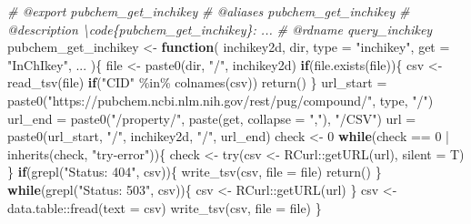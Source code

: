 \documentclass[
]{article}
\newenvironment{Shaded}{\begin{snugshade}}{\end{snugshade}}
\newcommand{\AttributeTok}[1]{\textcolor[rgb]{0.77,0.63,0.00}{#1}}
\newcommand{\CommentTok}[1]{\textcolor[rgb]{0.56,0.35,0.01}{\textit{#1}}}
\newcommand{\ControlFlowTok}[1]{\textcolor[rgb]{0.13,0.29,0.53}{\textbf{#1}}}
\newcommand{\DecValTok}[1]{\textcolor[rgb]{0.00,0.00,0.81}{#1}}
\newcommand{\FunctionTok}[1]{\textcolor[rgb]{0.00,0.00,0.00}{#1}}
\newcommand{\NormalTok}[1]{#1}
\newcommand{\OtherTok}[1]{\textcolor[rgb]{0.56,0.35,0.01}{#1}}
\newcommand{\SpecialCharTok}[1]{\textcolor[rgb]{0.00,0.00,0.00}{#1}}
\newcommand{\StringTok}[1]{\textcolor[rgb]{0.31,0.60,0.02}{#1}}
\begin{document}
\begin{Shaded}
\begin{Highlighting}[]
\CommentTok{\#\textquotesingle{} @export pubchem\_get\_inchikey}
\CommentTok{\#\textquotesingle{} @aliases pubchem\_get\_inchikey}
\CommentTok{\#\textquotesingle{} @description \textbackslash{}code\{pubchem\_get\_inchikey\}: ...}
\CommentTok{\#\textquotesingle{} @rdname query\_inchikey}
\NormalTok{pubchem\_get\_inchikey }\OtherTok{\textless{}{-}} 
  \ControlFlowTok{function}\NormalTok{(}
\NormalTok{           inchikey2d,}
\NormalTok{           dir,}
           \AttributeTok{type =} \StringTok{"inchikey"}\NormalTok{,}
           \AttributeTok{get =} \StringTok{"InChIkey"}\NormalTok{,}
\NormalTok{           ...}
\NormalTok{           )\{}
\NormalTok{    file }\OtherTok{\textless{}{-}} \FunctionTok{paste0}\NormalTok{(dir, }\StringTok{"/"}\NormalTok{, inchikey2d)}
    \ControlFlowTok{if}\NormalTok{(}\FunctionTok{file.exists}\NormalTok{(file))\{}
\NormalTok{      csv }\OtherTok{\textless{}{-}} \FunctionTok{read\_tsv}\NormalTok{(file)}
      \ControlFlowTok{if}\NormalTok{(}\StringTok{"CID"} \SpecialCharTok{\%in\%} \FunctionTok{colnames}\NormalTok{(csv))}
        \FunctionTok{return}\NormalTok{()}
\NormalTok{    \}}
\NormalTok{    url\_start }\OtherTok{=} \FunctionTok{paste0}\NormalTok{(}\StringTok{"https://pubchem.ncbi.nlm.nih.gov/rest/pug/compound/"}\NormalTok{, type, }\StringTok{"/"}\NormalTok{)}
\NormalTok{    url\_end }\OtherTok{=} \FunctionTok{paste0}\NormalTok{(}\StringTok{"/property/"}\NormalTok{, }\FunctionTok{paste}\NormalTok{(get, }\AttributeTok{collapse =} \StringTok{","}\NormalTok{), }\StringTok{"/CSV"}\NormalTok{)}
\NormalTok{    url }\OtherTok{=} \FunctionTok{paste0}\NormalTok{(url\_start, }\StringTok{"/"}\NormalTok{, inchikey2d, }\StringTok{"/"}\NormalTok{, url\_end)}
\NormalTok{    check }\OtherTok{\textless{}{-}} \DecValTok{0}
    \ControlFlowTok{while}\NormalTok{(check }\SpecialCharTok{==} \DecValTok{0} \SpecialCharTok{|} \FunctionTok{inherits}\NormalTok{(check, }\StringTok{"try{-}error"}\NormalTok{))\{}
\NormalTok{      check }\OtherTok{\textless{}{-}} \FunctionTok{try}\NormalTok{(csv }\OtherTok{\textless{}{-}}\NormalTok{ RCurl}\SpecialCharTok{::}\FunctionTok{getURL}\NormalTok{(url), }\AttributeTok{silent =}\NormalTok{ T)}
\NormalTok{    \}}
    \ControlFlowTok{if}\NormalTok{(}\FunctionTok{grepl}\NormalTok{(}\StringTok{"Status: 404"}\NormalTok{, csv))\{}
      \FunctionTok{write\_tsv}\NormalTok{(csv, }\AttributeTok{file =}\NormalTok{ file)}
      \FunctionTok{return}\NormalTok{()}
\NormalTok{    \}}
    \ControlFlowTok{while}\NormalTok{(}\FunctionTok{grepl}\NormalTok{(}\StringTok{"Status:    503"}\NormalTok{, csv))\{}
\NormalTok{      csv }\OtherTok{\textless{}{-}}\NormalTok{ RCurl}\SpecialCharTok{::}\FunctionTok{getURL}\NormalTok{(url)}
\NormalTok{    \}}
\NormalTok{    csv }\OtherTok{\textless{}{-}}\NormalTok{ data.table}\SpecialCharTok{::}\FunctionTok{fread}\NormalTok{(}\AttributeTok{text =}\NormalTok{ csv)}
    \FunctionTok{write\_tsv}\NormalTok{(csv, }\AttributeTok{file =}\NormalTok{ file)}
\NormalTok{  \}}
\end{Highlighting}
\end{Shaded}
\end{document}
